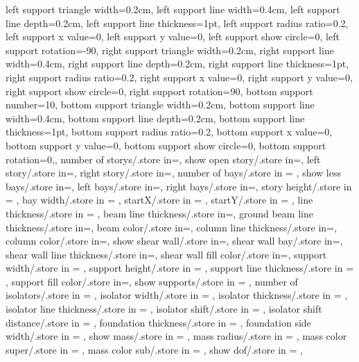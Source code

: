 {{  left support triangle width=0.2cm,
  left support line width=0.4cm,
  left support line depth=0.2cm,
  left support line thickness=1pt,
  left support radius ratio=0.2,
  left support x value=0,
  left support y value=0,
  left support show circle=0,
  left support rotation=-90,
  right support triangle width=0.2cm,
  right support line width=0.4cm,
  right support line depth=0.2cm,
  right support line thickness=1pt,
  right support radius ratio=0.2,
  right support x value=0,
  right support y value=0,
  right support show circle=0,
  right support rotation=90,
  bottom support number=10,
  bottom support triangle width=0.2cm,
  bottom support line width=0.4cm,
  bottom support line depth=0.2cm,
  bottom support line thickness=1pt,
  bottom support radius ratio=0.2,
  bottom support x value=0,
  bottom support y value=0,
  bottom support show circle=0,
  bottom support rotation=0,},
  number of storys/.store in=\storynumber,
  show open story/.store in=\showopenstory,
  left story/.store in=\leftstory,
  right story/.store in=\rightstory,
  number of bays/.store in = \baynumber,
  show less bays/.store in=\showlessbays,
  left bays/.store in=\leftbays,
  right bays/.store in=\rightbays,
  story height/.store in = \storyheight,
  bay width/.store in = \baywidth,
  startX/.store in = \startx,
  startY/.store in = \starty,
  line thickness/.store in = \linet,
  beam line thickness/.store in=\beamlinet,
  ground beam line thickness/.store in=\groundbeamlinet,
  beam color/.store in=\beamcolor,
  column line thickness/.store in=\collinet,
  column color/.store in=\columncolor,
  show shear wall/.store in=\showshearwall,
  shear wall bay/.store in=\shearwallbay,
  shear wall line thickness/.store in=\shearwalllinet,
  shear wall fill color/.store in=\shearwallfillcolor,
  support width/.store in = \supportwidth,
  support height/.store in = \supportheight,
  support line thickness/.store in = \baselinet,
  support fill color/.store in=\supportfillcolor,
  show supports/.store in = \showsupports,
  number of isolators/.store in = \numberofisolators,
  isolator width/.store in = \isolationwidth,
  isolator thickness/.store in = \isolationdepth,
  isolator line thickness/.store in = \isolinet,
  isolator shift/.store in = \isoshiftyn,
  isolator shift distance/.store in = \isoshift,
  foundation thickness/.store in = \foundationdepth,
  foundation side width/.store in = \foundsidew,
  show mass/.store in = \showmass,
  mass radius/.store in = \massrad,
  mass color super/.store in = \masscolorsuper,
  mass color sub/.store in = \masscolorsub,
  show dof/.store in = \showdof,
}
